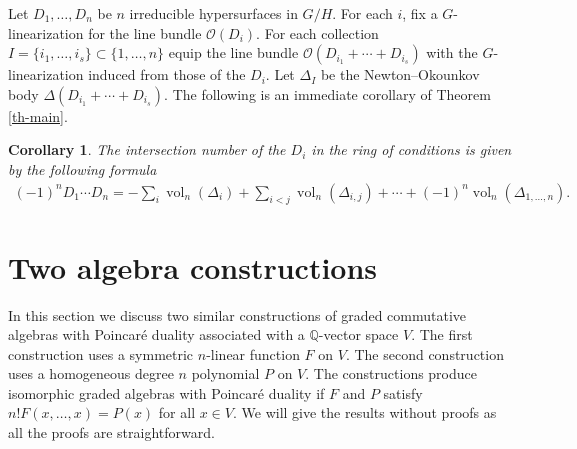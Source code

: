 \documentclass[pdftex]{sigma}
\def \Q{\mathbb{Q}}
\def \vol{\operatorname{vol}}
\numberwithin{equation}{section}
\newtheorem{Cor}[Th]{Corollary}
\theoremstyle{definition}
\begin{document}
Let $D_1, \ldots, D_n$ be $n$ irreducible hypersurfaces in $G/H$. For each $i$, fix a $G$-linearization for the line bundle $\mathcal{O}(D_i)$. For each collection $I = \{i_1, \ldots, i_s\} \subset \{1, \ldots, n\}$ equip the line bundle $\mathcal{O}(D_{i_1} + \cdots + D_{i_s})$ with the $G$-linearization induced from those of the $D_i$. Let $\Delta_I$ be the Newton--Okounkov body $\Delta(D_{i_1} + \cdots + D_{i_s})$.
The following is an immediate corollary of Theorem \ref{th-main}.
\begin{Cor} \label{cor-main}
The intersection number of the $D_i$ in the ring of conditions is given by the following formula\begin{gather*}
(-1)^n D_1 \cdots D_n = - \sum_{i} \vol_n(\Delta_i) + \sum_{i < j} \vol_n(\Delta_{i,j}) + \cdots
+ (-1)^n \vol_n(\Delta_{1, \ldots, n}).
\end{gather*}
\end{Cor}

\section{Two algebra constructions} \label{sec-alg-construction} In this section we discuss two similar constructions of graded commutative algebras with Poincar\'{e} duality associated with a $\Q$-vector space $V$. The first construction uses a symmetric $n$-linear function $F$ on $V$. The second construction uses a homogeneous degree $n$ polynomial $P$ on $V$. The constructions produce isomorphic graded algebras with Poincar\'{e} duality if $F$ and $P$ satisfy $n! F(x,\dots,x)=P(x)$ for all $x \in V$. We will give the results without proofs as all the proofs are straightforward.
\end{document}
